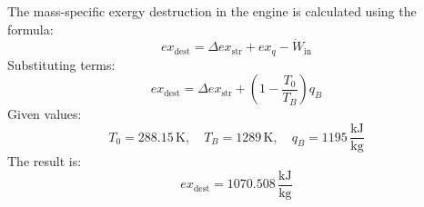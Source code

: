The mass-specific exergy destruction in the engine is calculated using the formula:  
\[
ex_{\text{dest}} = \Delta ex_{\text{str}} + ex_q - \dot{W}_{\text{in}}
\]  
Substituting terms:  
\[
ex_{\text{dest}} = \Delta ex_{\text{str}} + \left( 1 - \frac{T_0}{T_B} \right) q_B
\]  
Given values:  
\[
T_0 = 288.15 \, \text{K}, \quad T_B = 1289 \, \text{K}, \quad q_B = 1195 \, \frac{\text{kJ}}{\text{kg}}
\]  
The result is:  
\[
ex_{\text{dest}} = 1070.508 \, \frac{\text{kJ}}{\text{kg}}
\]